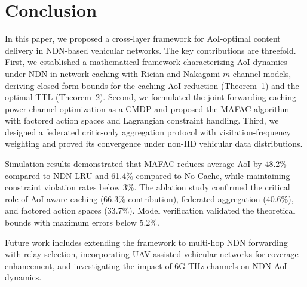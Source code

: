 \documentclass[journal]{IEEEtran}
\begin{document}
\section{Conclusion} \label{sec.c}

In this paper, we proposed a cross-layer framework for AoI-optimal content delivery in NDN-based vehicular networks. The key contributions are threefold. First, we established a mathematical framework characterizing AoI dynamics under NDN in-network caching with Rician and Nakagami-$m$ channel models, deriving closed-form bounds for the caching AoI reduction (Theorem~1) and the optimal TTL (Theorem~2). Second, we formulated the joint forwarding-caching-power-channel optimization as a CMDP and proposed the MAFAC algorithm with factored action spaces and Lagrangian constraint handling. Third, we designed a federated critic-only aggregation protocol with visitation-frequency weighting and proved its convergence under non-IID vehicular data distributions.

Simulation results demonstrated that MAFAC reduces average AoI by 48.2\% compared to NDN-LRU and 61.4\% compared to No-Cache, while maintaining constraint violation rates below 3\%. The ablation study confirmed the critical role of AoI-aware caching (66.3\% contribution), federated aggregation (40.6\%), and factored action spaces (33.7\%). Model verification validated the theoretical bounds with maximum errors below 5.2\%.

Future work includes extending the framework to multi-hop NDN forwarding with relay selection, incorporating UAV-assisted vehicular networks for coverage enhancement, and investigating the impact of 6G THz channels on NDN-AoI dynamics.
\end{document}
